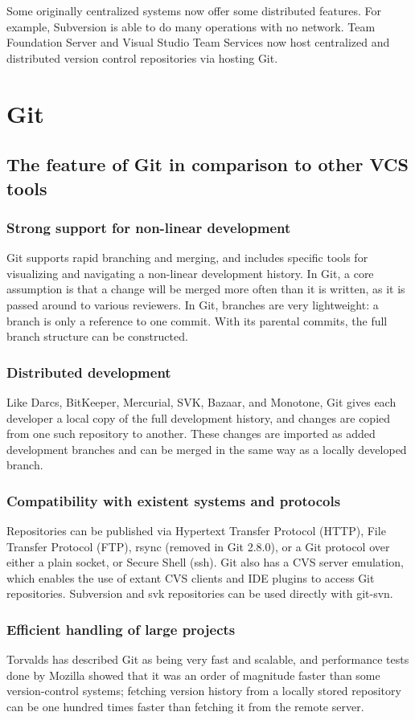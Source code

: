 \documentclass[a4paper]{report}
\begin{document}
\par
Some originally centralized systems now offer some distributed features. For example, Subversion is able to do many operations with no network. Team Foundation Server and Visual Studio Team Services now host centralized and distributed version control repositories via hosting Git.

\section{Git}
\subsection{The feature of Git in comparison to other VCS tools}
\subsubsection{Strong support for non-linear development}
\par
Git supports rapid branching and merging, and includes specific tools for visualizing and navigating a non-linear development history. In Git, a core assumption is that a change will be merged more often than it is written, as it is passed around to various reviewers. In Git, branches are very lightweight: a branch is only a reference to one commit. With its parental commits, the full branch structure can be constructed.
\subsubsection{Distributed development}
Like Darcs, BitKeeper, Mercurial, SVK, Bazaar, and Monotone, Git gives each developer a local copy of the full development history, and changes are copied from one such repository to another. These changes are imported as added development branches and can be merged in the same way as a locally developed branch.
\subsubsection{Compatibility with existent systems and protocols}
Repositories can be published via Hypertext Transfer Protocol (HTTP), File Transfer Protocol (FTP), rsync (removed in Git 2.8.0), or a Git protocol over either a plain socket, or Secure Shell (ssh). Git also has a CVS server emulation, which enables the use of extant CVS clients and IDE plugins to access Git repositories. Subversion and svk repositories can be used directly with git-svn.
\subsubsection{Efficient handling of large projects}
Torvalds has described Git as being very fast and scalable, and performance tests done by Mozilla showed that it was an order of magnitude faster than some version-control systems; fetching version history from a locally stored repository can be one hundred times faster than fetching it from the remote server.
\end{document}
